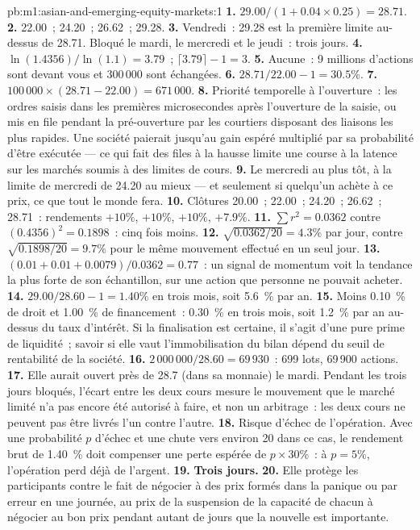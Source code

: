 \begin{solution}{pb:m1:asian-and-emerging-equity-markets:1}
\textbf{1.} $29.00/(1 + 0.04\times0.25) = 28.71$.
\textbf{2.} 22.00~; 24.20~; 26.62~; 29.28.
\textbf{3.} Vendredi~: 29.28 est la première limite au-dessus de 28.71. Bloqué le mardi,
le mercredi et le jeudi~: trois jours.
\textbf{4.} $\ln(1.4356)/\ln(1.1) = 3.79$~; $\lceil3.79\rceil - 1 = 3$.
\textbf{5.} Aucune~: 9 millions d'actions sont devant vous et 300\,000 sont échangées.
\textbf{6.} $28.71/22.00 - 1 = 30.5\%$.
\textbf{7.} $100\,000 \times (28.71 - 22.00) = 671\,000$.
\textbf{8.} Priorité temporelle à l'ouverture~: les ordres saisis dans les
premières microsecondes après l'ouverture de la saisie, ou mis en file pendant la pré-ouverture par les
courtiers disposant des liaisons les plus rapides. Une société paierait jusqu'au gain espéré
multiplié par sa probabilité d'être exécutée --- ce qui fait des files à la hausse limite
une course à la latence sur les marchés soumis à des limites de cours.
\textbf{9.} Le mercredi au plus tôt, à la limite de mercredi de 24.20 au mieux
--- et seulement si quelqu'un achète à ce prix, ce que tout le monde fera.
\textbf{10.} Clôtures 20.00~; 22.00~; 24.20~; 26.62~; 28.71~: rendements $+10\%$,
$+10\%$, $+10\%$, $+7.9\%$.
\textbf{11.} $\sum r^2 = 0.0362$ contre $(0.4356)^2 = 0.1898$~: cinq fois
moins.
\textbf{12.} $\sqrt{0.0362/20} = 4.3\%$ par jour, contre $\sqrt{0.1898/20} =
9.7\%$ pour le même mouvement effectué en un seul jour.
\textbf{13.} $(0.01 + 0.01 + 0.0079)/0.0362 = 0.77$~: un signal de momentum voit
la tendance la plus forte de son échantillon, sur une action que personne ne pouvait acheter.
\textbf{14.} $29.00/28.60 - 1 = 1.40\%$ en trois mois, soit 5.6~\% par an.
\textbf{15.} Moins 0.10~\% de droit et 1.00~\% de financement~: 0.30~\% en
trois mois, soit 1.2~\% par an au-dessus du taux d'intérêt. Si la finalisation est certaine,
il s'agit d'une pure prime de liquidité~; savoir si elle vaut l'immobilisation du bilan dépend
du seuil de rentabilité de la société.
\textbf{16.} $2\,000\,000/28.60 = 69\,930$~: 699 lots, 69\,900 actions.
\textbf{17.} Elle aurait ouvert près de 28.7 (dans sa monnaie) le mardi.
Pendant les trois jours bloqués, l'écart entre les deux cours mesure le
mouvement que le marché limité n'a pas encore été autorisé à faire, et non un
arbitrage~: les deux cours ne peuvent pas être livrés l'un contre l'autre.
\textbf{18.} Risque d'échec de l'opération. Avec une probabilité $p$ d'échec et une chute vers
environ 20 dans ce cas, le rendement brut de 1.40~\% doit compenser une perte espérée
de $p \times 30\%$~: à $p = 5\%$, l'opération perd déjà de l'argent.
\textbf{19.} \textbf{Trois jours.}
\textbf{20.} Elle protège les participants contre le fait de négocier à des prix formés dans la panique
ou par erreur en une journée, au prix de la suspension de la capacité de chacun à négocier
au bon prix pendant autant de jours que la nouvelle est importante.
\end{solution}

